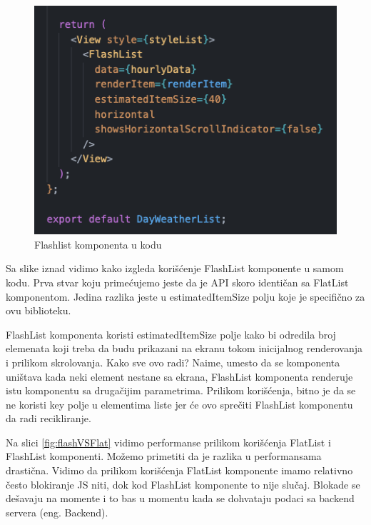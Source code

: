 \documentclass[12pt,oneside]{memoir}
\begin{document}
\begin{figure}[h!]
    \centering
    \includegraphics[scale=0.5]{docs/images/chapterFive/flashlistExample.png}
    \caption{Flashlist komponenta u kodu}
    \label{fig:flashListExample}
\end{figure}

Sa slike iznad vidimo kako izgleda korišćenje FlashList komponente u samom kodu. Prva stvar koju primećujemo jeste da je API skoro identičan sa FlatList komponentom. Jedina razlika jeste u estimatedItemSize polju koje je specifično za ovu biblioteku.


FlashList komponenta koristi estimatedItemSize polje kako bi odredila broj elemenata koji treba da budu prikazani na ekranu tokom inicijalnog renderovanja i prilikom skrolovanja. Kako sve ovo radi? Naime, umesto da se komponenta uništava kada neki element nestane sa ekrana, FlashList komponenta renderuje istu komponentu sa drugačijim parametrima. Prilikom korišćenja, bitno je da se ne koristi key polje u elementima liste jer će ovo sprečiti FlashList komponentu da radi recikliranje.


Na slici \ref{fig:flashVSFlat} vidimo performanse prilikom korišćenja FlatList i FlashList komponenti. Možemo primetiti da je razlika u performansama drastična. Vidimo da prilikom korišćenja FlatList komponente imamo relativno često blokiranje JS niti, dok kod FlashList komponente to nije slučaj. Blokade se dešavaju na momente i to bas u momentu kada se dohvataju podaci sa backend servera (eng. Backend).
\end{document}
